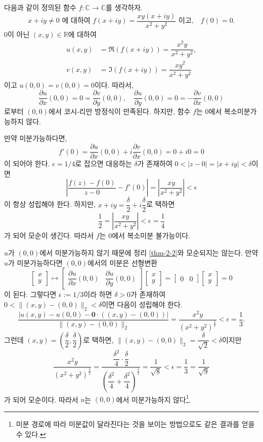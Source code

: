 \begin{saltexample}[label=example-2-10]{}{}
다음과 같이 정의된 함수 $f:\mathbb C \to \mathbb C$를 생각하자.
\[
x+iy\ne0 \text{ 에 대하여 } f(x+iy) = \dfrac{xy(x+iy)}{x^2+y^2} \text{ 이고,}\quad f(0)=0.
\]
$0$이 아닌 $(x,y)\in\mathbb R$에 대하여
\begin{align*}
u(x,y) &= \Re(f(x+iy)) = \dfrac{x^2y}{x^2+y^2}, \\
v(x,y) &= \Im(f(x+iy)) = \dfrac{xy^2}{x^2+y^2}
\end{align*}
이고 $u(0,0) = v(0,0) = 0$이다.
따라서,
\[
\dfrac{\partial u}{\partial x}(0,0) = 0 = \dfrac{\partial v}{\partial y}(0,0),
\quad
\dfrac{\partial u}{\partial y}(0,0) = 0 = -\dfrac{\partial v}{\partial x}(0,0)
\]
로부터 $(0,0)$에서 코시-리만 방정식이 만족된다.
하지만, 함수 $f$는 $0$에서 복소미분가능하지 않다.

만약 미분가능하다면,
\[
f'(0) = \dfrac{\partial u}{\partial x}(0,0)  + i \dfrac{\partial v}{\partial x}(0,0)  
= 0+ i0 =0
\]
이 되어야 한다. $\epsilon=1/4$로 잡으면
대응하는 $\delta$가 존재하여
$0<|z-0| = |x+iy| <\delta$이면
\[
\left| \dfrac{f(z)-f(0)}{z-0} - f'(0) \right| = \left| \dfrac{xy}{x^2+y^2} \right| < \epsilon
\]
이 항상 성립해야 한다.
하지만, $x+iy = \dfrac\delta 2 + i\dfrac\delta 2$로 택하면
\[
\dfrac12 = \left| \dfrac{xy}{x^2+y^2} \right| < \epsilon = \dfrac 14
\]
가 되어 모순이 생긴다. 따라서 $f$는 $0$에서 복소미분 불가능이다.

$u$가 $(0,0)$에서 미분가능하지 않기 때문에
정리 \ref{thm-2-2}와 모순되지는 않는다.
만약 $u$가 미분가능하다면 $(0,0)$에서의 미분은 선형변환
\[
\begin{bmatrix}
x\\ y
\end{bmatrix}
\mapsto
\begin{bmatrix}
\dfrac{\partial u}{\partial x}(0,0) & \dfrac{\partial u}{\partial y}(0,0)
\end{bmatrix}
\begin{bmatrix}
x\\ y
\end{bmatrix}
=
\begin{bmatrix}
0 & 0
\end{bmatrix}
\begin{bmatrix}
x\\ y
\end{bmatrix}
= 0
\]
이 된다.
그렇다면 $\epsilon:=1/3$이라 하면
$\delta>0$가 존재하여 
$0<\| (x,y) - (0,0)\|_2 < \delta$이면 다음이 성립해야 한다.
\[
\dfrac{|u(x,y) - u(0,0) - \mathbf{0}\cdot((x,y)-(0,0))|}{\|(x,y) - (0,0)\|_2}
= \dfrac{x^2y}{(x^2+y^2)^{\frac32}} < \epsilon = \dfrac 13.
\]
그런데 $(x,y) = \left(\dfrac\delta2,\dfrac\delta2\right)$로 택하면,
$\|(x,y) - (0,0)\|_2 = \dfrac\delta{\sqrt{2}} < \delta$이지만
\[
\dfrac{x^2y}{(x^2+y^2)^{\frac32}}
= \dfrac{\dfrac{\delta^2}4\cdot \dfrac\delta2}
{\left(\dfrac{\delta^2}4+\dfrac{\delta^2}4\right)^{\frac32}} 
= \dfrac1{\sqrt{8}} < \epsilon = \dfrac 13 = \dfrac 1{\sqrt{9}}
\]
가 되어 모순이다. 따라서 $u$는 $(0,0)$에서 미분가능하지 않다\footnote{
미분 경로에 따라 미분값이 달라진다는 것을 보이는 방법으로도
같은 결과를 얻을 수 있다.}.
\end{saltexample}

